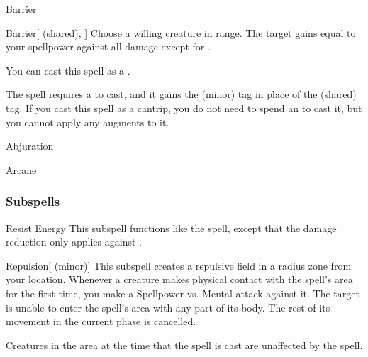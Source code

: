 \newpage
\begin{spellsection}{Barrier}

\begin{spellheader}
\end{spellheader}


\begin{ability}{Barrier}[ (shared), ]
Choose a willing creature in \rngclose range.
The target gains  equal to your spellpower against all damage except for .

You can cast this spell as a .
\end{ability}



 The spell requires a  to cast, and it gains the  (minor) tag in place of the  (shared) tag. If you cast this spell as a cantrip,
you do not need to spend an  to cast it,
but you cannot apply any augments to it.


 Abjuration

 Arcane
\end{spellsection}


\subsubsection{Subspells}


\begin{ability}[\nth{1}]{Resist Energy}
This subspell functions like the  spell, except that the damage reduction only applies against .
\end{ability}
\vspace{0.25em}


\begin{ability}[\nth{2}]{Repulsion}[ (minor)]
This subspell creates a repulsive field in a \areamed radius zone from your location.
Whenever a creature makes physical contact with the spell's area for the first time, you make a Spellpower vs. Mental attack against it.
\hit The target is unable to enter the spell's area with any part of its body.
The rest of its movement in the current phase is cancelled.

Creatures in the area at the time that the spell is cast are unaffected by the spell.
\end{ability}
\vspace{0.25em}


